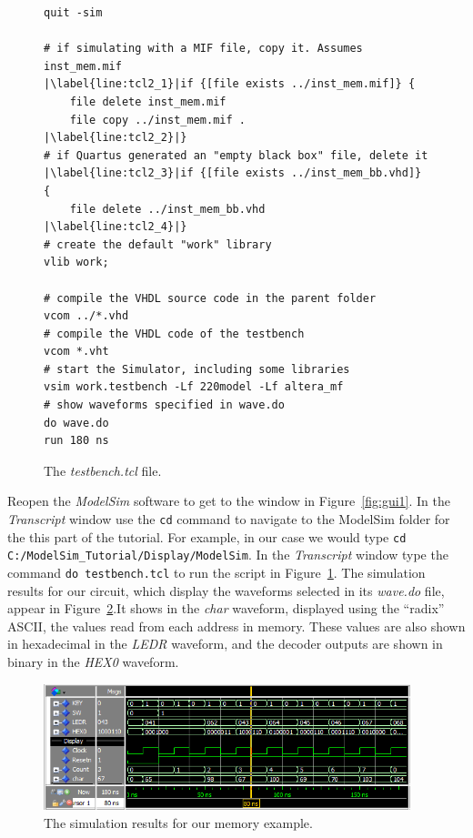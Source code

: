 \documentclass[11pt, twoside, pdftex]{article}
\begin{document}
\lstset{language=Tcl,numbers=left,escapechar=|}
\begin{figure}[h!]
\begin{center}
\begin{minipage}[h]{15 cm}
\begin{lstlisting}[name=tcl2]
quit -sim

# if simulating with a MIF file, copy it. Assumes inst_mem.mif
|\label{line:tcl2_1}|if {[file exists ../inst_mem.mif]} {
	file delete inst_mem.mif
	file copy ../inst_mem.mif .
|\label{line:tcl2_2}|}
# if Quartus generated an "empty black box" file, delete it
|\label{line:tcl2_3}|if {[file exists ../inst_mem_bb.vhd]} {
	file delete ../inst_mem_bb.vhd
|\label{line:tcl2_4}|}
# create the default "work" library
vlib work;

# compile the VHDL source code in the parent folder
vcom ../*.vhd
# compile the VHDL code of the testbench
vcom *.vht
# start the Simulator, including some libraries
vsim work.testbench -Lf 220model -Lf altera_mf
# show waveforms specified in wave.do
do wave.do
run 180 ns
\end{lstlisting}
\end{minipage}
\caption{The {\it testbench.tcl} file.}
\label{fig:tcl2}
\end{center}
\end{figure}

\noindent
Reopen the {\it ModelSim} software to get to the window in Figure~\ref{fig:gui1}.
In the {\it Transcript} window use the \texttt{cd} command to navigate to the 
ModelSim folder for the this part of the tutorial. For example, in our 
case we would type \texttt{cd C:/ModelSim\_Tutorial/Display/ModelSim}. 
In the {\it Transcript} window type the command \texttt{do~testbench.tcl} to run
the script in Figure~\ref{fig:tcl2}.
The simulation results for our circuit, which display the waveforms selected in its
{\it wave.do} file, appear in Figure~\ref{fig:gui4}.It shows in the {\it char} 
waveform, displayed using the ``radix'' ASCII, the values read from each address in memory.
These values are also shown in hexadecimal in the {\it LEDR} waveform, and the 
decoder outputs are shown in binary in the {\it HEX0} waveform.

\begin{figure}[h!]
	\begin{center}
		\includegraphics[width = 0.95\textwidth]{figures/display.png}
	\end{center}
		  \caption{The simulation results for our memory example.}
	\label{fig:gui4}
\end{figure}
\end{document}

